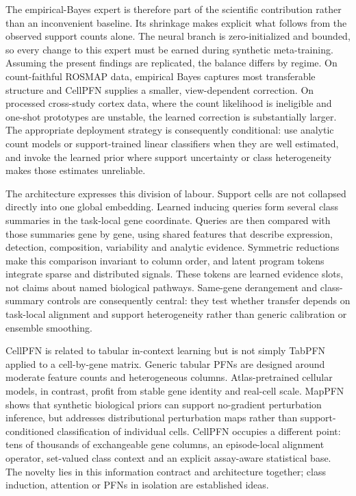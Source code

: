\documentclass[12pt]{article}
\begin{document}
The empirical-Bayes expert is therefore part of the scientific contribution rather than an inconvenient baseline. Its shrinkage makes explicit what follows from the observed support counts alone. The neural branch is zero-initialized and bounded, so every change to this expert must be earned during synthetic meta-training. Assuming the present findings are replicated, the balance differs by regime. On count-faithful ROSMAP data, empirical Bayes captures most transferable structure and CellPFN supplies a smaller, view-dependent correction. On processed cross-study cortex data, where the count likelihood is ineligible and one-shot prototypes are unstable, the learned correction is substantially larger. The appropriate deployment strategy is consequently conditional: use analytic count models or support-trained linear classifiers when they are well estimated, and invoke the learned prior where support uncertainty or class heterogeneity makes those estimates unreliable.

The architecture expresses this division of labour. Support cells are not collapsed directly into one global embedding. Learned inducing queries form several class summaries in the task-local gene coordinate. Queries are then compared with those summaries gene by gene, using shared features that describe expression, detection, composition, variability and analytic evidence. Symmetric reductions make this comparison invariant to column order, and latent program tokens integrate sparse and distributed signals. These tokens are learned evidence slots, not claims about named biological pathways. Same-gene derangement and class-summary controls are consequently central: they test whether transfer depends on task-local alignment and support heterogeneity rather than generic calibration or ensemble smoothing.

CellPFN is related to tabular in-context learning but is not simply TabPFN applied to a cell-by-gene matrix. Generic tabular PFNs are designed around moderate feature counts and heterogeneous columns. Atlas-pretrained cellular models, in contrast, profit from stable gene identity and real-cell scale. MapPFN shows that synthetic biological priors can support no-gradient perturbation inference, but addresses distributional perturbation maps rather than support-conditioned classification of individual cells\cite{sextro2026mappfn}. CellPFN occupies a different point: tens of thousands of exchangeable gene columns, an episode-local alignment operator, set-valued class context and an explicit assay-aware statistical base. The novelty lies in this information contract and architecture together; class induction, attention or PFNs in isolation are established ideas.
\end{document}
